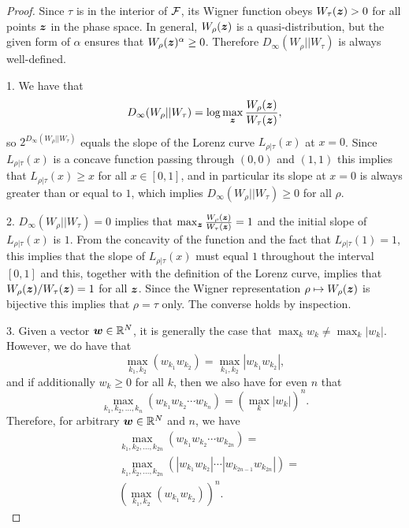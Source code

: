 \documentclass[pra,
aps,
twocolumn,
superscriptaddress,
groupedaddress,
nofootinbib,
reprint
]{revtex4-1}
\begin{document}
\begin{proof}
	Since $\tau$ is in the interior of ${\mathcal F}$, its Wigner function obeys $W_\tau(\bm{z}) >0$ for all points $\bm{z}$ in the phase space. 
In general, $W_\rho(\bm{z})$ is a quasi-distribution, but the given form of $\alpha$ ensures that $W_{\rho}(\bm{z})^\alpha \geq 0$. 
Therefore $D_\infty (W_\rho || W_\tau)$ is always well-defined.

1. We have that 
\begin{equation}
	D_\infty(W_\rho || W_\tau) =\log  \max_{\bm{z}} \frac{W_\rho(\boldsymbol{z})}{W_\tau(\boldsymbol{z})},
\end{equation}
so $2^{D_\infty(W_\rho || W_\tau)}$ equals the slope of the Lorenz curve $L_{\rho|\tau}(x)$ at $x=0$. Since $L_{\rho|\tau}(x)$ is a concave function passing through $(0,0)$ and $(1,1)$ this implies that $L_{\rho |\tau}(x) \ge x$ for all $x \in [0,1]$, and in particular its slope at $x=0$ is always greater than or equal to $1$, which implies $D_\infty(W_\rho || W_\tau) \geq 0$ for all $\rho$.

2. $D_\infty(W_\rho || W_\tau) = 0$ implies that $\max_{\bm{z}} \frac{W_\rho(\bm{z})}{W_\tau(\bm{z})}=1$ and the initial slope of $L_{\rho|\tau}(x)$ is $1$. From the concavity of the function and the fact that $L_{\rho|\tau}(1)=1$, this implies that the slope of $L_{\rho|\tau}(x)$ must equal $1$ throughout the interval $[0,1]$ and this, together with the definition of the Lorenz curve, implies that $W_\rho(\bm{z})/W_\tau(\bm{z}) = 1$ for all $\bm{z}$. Since the Wigner representation $\rho \mapsto W_\rho(\bm{z})$ is bijective this implies that $\rho = \tau$ only. The converse holds by inspection.

3. Given a vector $\boldsymbol{w} \in \mathbb{R}^N$, it is generally the case that $\max_k w_k \ne \max_k |w_k|$. 
However, we do have that
\begin{equation}
	\max_{k_1,k_2} (w_{k_1} w_{k_2}) = \max_{k_1,k_2} |w_{k_1} w_{k_2}|,
\end{equation}
and if additionally $w_k \geq 0$ for all $k$, then we also have for even $n$ that
\begin{equation}
	\max_{k_1, k_2, \dots, k_n} \left( w_{k_1}w_{k_2}\cdots w_{k_n} \right) = (\max_k |w_k|)^n.
\end{equation}
Therefore, for arbitrary $\boldsymbol{w} \in \mathbb{R}^N$ and $n$, we have
\begin{align}
	&\max_{k_1, k_2, \dots, k_{2n}}\left( w_{k_1}w_{k_2}\cdots w_{k_{2n}} \right) = \nonumber\\
	&\max_{k_1, k_2, \dots, k_{2n}}\left( |w_{k_1}w_{k_2}|\cdots |w_{k_{2n-1}}w_{k_{2n}}| \right) = \nonumber \\
	&\left( \max_{k_1 ,k_2}\left( w_{k_1} w_{k_2} \right) \right)^n.
\end{align}


\end{proof}
\end{document}
